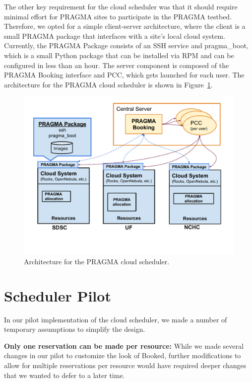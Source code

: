 \documentclass{acm_proc_article-sp}
\begin{document}
The other key requirement for the cloud scheduler was that it should require minimal effort for PRAGMA sites to participate in the PRAGMA testbed.  Therefore, we opted for a simple client-server architecture, where the client is a small PRAGMA package that interfaces with a site's local cloud system.  Currently, the PRAGMA Package consists of an SSH service and pragma\_boot, which is a small Python package that can be installed via RPM and can be configured in less than an hour.  The server component is composed of the PRAGMA Booking interface and PCC, which gets launched for each user.  The architecture for the PRAGMA cloud scheduler is shown in Figure~\ref{Fig:Arch}.

\begin{figure}[htbp]
\begin{center}
\includegraphics[width=\columnwidth]{figures/arch.pdf}
\caption{Architecture for the PRAGMA cloud scheduler.}
\label{Fig:Arch}
\end{center}
\end{figure}

\section{Scheduler Pilot}
\label{Sec:Pilot}

In our pilot implementation of the cloud scheduler, we made a number of temporary assumptions to simplify the design.

\textbf{Only one reservation can be made per resource:}  While we made several changes in our pilot to customize the look of Booked, further modifications to allow for multiple reservations per resource would have required deeper changes that we wanted to defer to a later time.   
\end{document}
